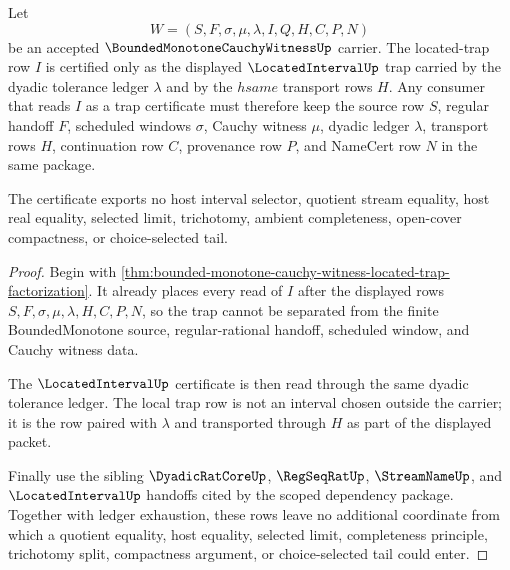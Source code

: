 \begin{theorem}
\label{thm:bounded-monotone-cauchy-witness-located-interval-trap-certificate}
Let
$$
W=(S,F,\sigma,\mu,\lambda,I,Q,H,C,P,N)
$$
be an accepted $\BoundedMonotoneCauchyWitnessUp$ carrier. The located-trap row $I$ is certified only as the displayed $\LocatedIntervalUp$ trap carried by the dyadic tolerance ledger $\lambda$ and by the $hsame$ transport rows $H$. Any consumer that reads $I$ as a trap certificate must therefore keep the source row $S$, regular handoff $F$, scheduled windows $\sigma$, Cauchy witness $\mu$, dyadic ledger $\lambda$, transport rows $H$, continuation row $C$, provenance row $P$, and NameCert row $N$ in the same package.

The certificate exports no host interval selector, quotient stream equality, host real equality, selected limit, trichotomy, ambient completeness, open-cover compactness, or choice-selected tail.
\end{theorem}
\begin{proof}
Begin with \autoref{thm:bounded-monotone-cauchy-witness-located-trap-factorization}. It already places every read of $I$ after the displayed rows $S,F,\sigma,\mu,\lambda,H,C,P,N$, so the trap cannot be separated from the finite BoundedMonotone source, regular-rational handoff, scheduled window, and Cauchy witness data.

The $\LocatedIntervalUp$ certificate is then read through the same dyadic tolerance ledger. The local trap row is not an interval chosen outside the carrier; it is the row paired with $\lambda$ and transported through $H$ as part of the displayed packet.

Finally use the sibling $\DyadicRatCoreUp$, $\RegSeqRatUp$, $\StreamNameUp$, and $\LocatedIntervalUp$ handoffs cited by the scoped dependency package. Together with ledger exhaustion, these rows leave no additional coordinate from which a quotient equality, host equality, selected limit, completeness principle, trichotomy split, compactness argument, or choice-selected tail could enter.
\end{proof}

